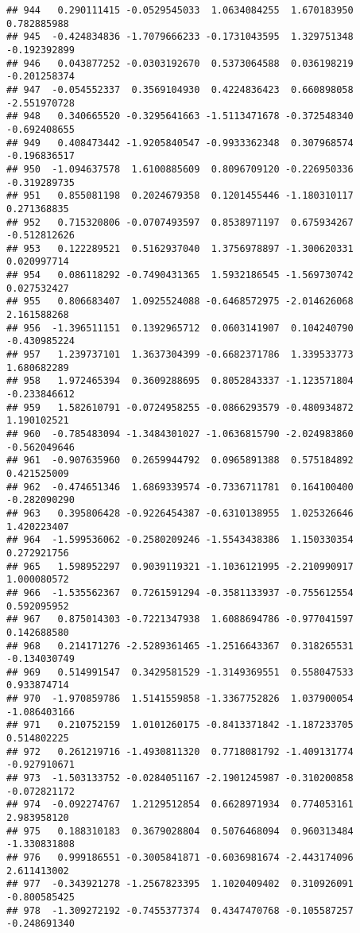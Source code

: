 \documentclass[
]{article}
\begin{document}
\begin{verbatim}
## 944   0.290111415 -0.0529545033  1.0634084255  1.670183950  0.782885988
## 945  -0.424834836 -1.7079666233 -0.1731043595  1.329751348 -0.192392899
## 946   0.043877252 -0.0303192670  0.5373064588  0.036198219 -0.201258374
## 947  -0.054552337  0.3569104930  0.4224836423  0.660898058 -2.551970728
## 948   0.340665520 -0.3295641663 -1.5113471678 -0.372548340 -0.692408655
## 949   0.408473442 -1.9205840547 -0.9933362348  0.307968574 -0.196836517
## 950  -1.094637578  1.6100885609  0.8096709120 -0.226950336 -0.319289735
## 951   0.855081198  0.2024679358  0.1201455446 -1.180310117  0.271368835
## 952   0.715320806 -0.0707493597  0.8538971197  0.675934267 -0.512812626
## 953   0.122289521  0.5162937040  1.3756978897 -1.300620331  0.020997714
## 954   0.086118292 -0.7490431365  1.5932186545 -1.569730742  0.027532427
## 955   0.806683407  1.0925524088 -0.6468572975 -2.014626068  2.161588268
## 956  -1.396511151  0.1392965712  0.0603141907  0.104240790 -0.430985224
## 957   1.239737101  1.3637304399 -0.6682371786  1.339533773  1.680682289
## 958   1.972465394  0.3609288695  0.8052843337 -1.123571804 -0.233846612
## 959   1.582610791 -0.0724958255 -0.0866293579 -0.480934872  1.190102521
## 960  -0.785483094 -1.3484301027 -1.0636815790 -2.024983860 -0.562049646
## 961  -0.907635960  0.2659944792  0.0965891388  0.575184892  0.421525009
## 962  -0.474651346  1.6869339574 -0.7336711781  0.164100400 -0.282090290
## 963   0.395806428 -0.9226454387 -0.6310138955  1.025326646  1.420223407
## 964  -1.599536062 -0.2580209246 -1.5543438386  1.150330354  0.272921756
## 965   1.598952297  0.9039119321 -1.1036121995 -2.210990917  1.000080572
## 966  -1.535562367  0.7261591294 -0.3581133937 -0.755612554  0.592095952
## 967   0.875014303 -0.7221347938  1.6088694786 -0.977041597  0.142688580
## 968   0.214171276 -2.5289361465 -1.2516643367  0.318265531 -0.134030749
## 969   0.514991547  0.3429581529 -1.3149369551  0.558047533  0.933874714
## 970  -1.970859786  1.5141559858 -1.3367752826  1.037900054 -1.086403166
## 971   0.210752159  1.0101260175 -0.8413371842 -1.187233705  0.514802225
## 972   0.261219716 -1.4930811320  0.7718081792 -1.409131774 -0.927910671
## 973  -1.503133752 -0.0284051167 -2.1901245987 -0.310200858 -0.072821172
## 974  -0.092274767  1.2129512854  0.6628971934  0.774053161  2.983958120
## 975   0.188310183  0.3679028804  0.5076468094  0.960313484 -1.330831808
## 976   0.999186551 -0.3005841871 -0.6036981674 -2.443174096  2.611413002
## 977  -0.343921278 -1.2567823395  1.1020409402  0.310926091 -0.800585425
## 978  -1.309272192 -0.7455377374  0.4347470768 -0.105587257 -0.248691340

\end{verbatim}
\end{document}
